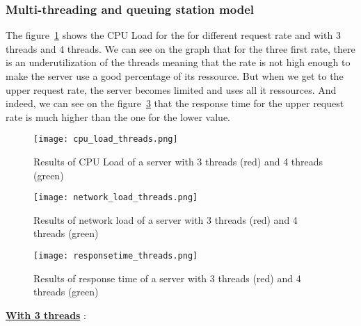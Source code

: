 \subsubsection{Multi-threading and queuing station model}
\label{subs:Multi-threading and queuing station model}
The figure~\ref{fig:cpuload_threads} shows the CPU Load for the for different request rate and
with 3 threads and 4 threads. We can see on the graph that for the three first rate, there is an
underutilization of the threads meaning that the rate is not high enough to make the server use
a good percentage of its ressource. But when we get to the upper request rate, the server becomes
limited and uses all it ressources. And indeed, we can see on the figure~\ref{fig:responsetime_threads}
that the response time for the upper request rate is much higher than the one for the lower value.


\begin{figure}[!ht]
    \centering
    \texttt{[image: cpu\_load\_threads.png]}
    \caption{Results of CPU Load of a server with 3 threads (red) and 4 threads (green)}
    \label{fig:cpuload_threads}
\end{figure}

\begin{figure}[!ht]
    \centering
    \texttt{[image: network\_load\_threads.png]}
    \caption{Results of network load of a server with 3 threads (red) and 4 threads (green)}
    \label{fig:network_threads}
\end{figure}

\begin{figure}[!ht]
    \centering
    \texttt{[image: responsetime\_threads.png]}
    \caption{Results of response time of a server with 3 threads (red) and 4 threads (green)}
    \label{fig:responsetime_threads}
\end{figure}

\underline{\textbf{With 3 threads}} :

